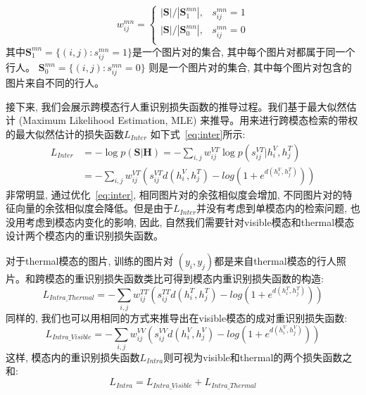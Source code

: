 \begin{equation}
  w^{mn}_{ij} = 
  \begin{cases}
  |\mathbf{S}|/|\mathbf{S}^{mn}_1|, &s^{mn}_{ij}=1\\
  |\mathbf{S}|/|\mathbf{S}^{mn}_0|, &s^{mn}_{ij}=0 \\
  \end{cases}
\end{equation}
其中$\mathbf{S}^{mn}_1 = \{(i,j): s^{mn}_{ij}=1\}$是一个图片对的集合, 其中每个图片对都属于同一个行人。 $\mathbf{S}^{mn}_0 = \{(i,j): s^{mn}_{ij}=0\}$ 则是一个图片对的集合, 其中每个图片对包含的图片来自不同的行人。\par
接下来, 我们会展示跨模态行人重识别损失函数的推导过程。我们基于最大似然估计 (Maximum Likelihood Estimation, MLE) 来推导。用来进行跨模态检索的带权的最大似然估计的损失函数$L_{Inter}$ 如下式~\ref{eq:inter}所示:
\begin{equation}
  \begin{aligned}
     L_{Inter} &= -\log{ p(\mathbf{S}|\mathbf{H})} 
      =  -\sum_{i, j}w^{VT}_{ij}\log{p(s^{VT}_{ij}|h_i^V,h_j^T)} \\
      &= -\sum_{i,j}w^{VT}_{ij}(s^{VT}_{ij}d(h_i^V,h_j^T)-log(1+e^{d(h_i^V,h_j^T)}))
 \end{aligned}
 \label{eq:inter}
  \end{equation}
非常明显, 通过优化~\ref{eq:inter}, 相同图片对的余弦相似度会增加, 不同图片对的特征向量的余弦相似度会降低。但是由于$L_{Inter}$并没有考虑到单模态内的检索问题, 也没用考虑到模态内变化的影响, 因此, 自然我们需要针对visible模态和thermal模态设计两个模态内的重识别损失函数。\par
对于thermal模态的图片, 训练的图片对 $(y_i, y_j)$都是来自thermal模态的行人照片。和跨模态的重识别损失函数类比可得到模态内重识别损失函数的构造:
\begin{equation}
  L_{Intra\_Thermal} = -\sum_{i,j}w^{TT}_{ij}(s^{TT}_{ij}d(h_i^T,h_j^T)-log(1+e^{d(h_i^T,h_j^T)}))
  \label{eq:intrathermal}
\end{equation}
同样的, 我们也可以用相同的方式来推导出在visible模态的成对重识别损失函数:
\begin{equation}
  L_{Intra\_Visible} = -\sum_{i,j}w^{VV}_{ij}(s^{VV}_{ij}d(h_i^V,h_j^V)-log(1+e^{d(h_i^V,h_j^V)}))
  \label{eq:intravisible}
\end{equation}
这样, 模态内的重识别损失函数$L_{Intra}$则可视为visible和thermal的两个损失函数之和:
\begin{equation}
  L_{Intra} = L_{Intra\_Visible} + L_{Intra\_Thermal}
\label{eq:Intra}
\end{equation}
